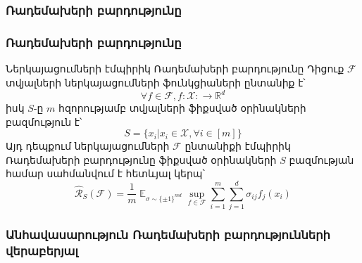 \documentclass[10pt]{beamer}
\DeclareMathOperator*{\E}{\mathbb{E}}
\begin{document}
\section{}


\subsection{}

\begin{frame}
\frametitle{\armfont Ռադեմախերի բարդությունը}
\end{frame}

\begin{frame}
\frametitle{\armfont Ռադեմախերի բարդությունը}

\begin{block}{\armfont Ներկայացումների էմպիրիկ Ռադեմախերի բարդությունը}
 \fontsize{8pt}{8pt}
\armfont Դիցուք $\mathcal{F}$ տվյալների ներկայացումների ֆունկցիաների ընտանիք է՝ $$\forall f \in \mathcal{F}, f:\mathcal{X}: \rightarrow \mathbb{R}^d$$
իսկ $S$-ը $m$ հզորությամբ տվյալների ֆիքսված օրինակների բազմություն է՝
$$S = \{x_i | x_i \in \mathcal{X}, \forall i \in [m]\}$$
Այդ դեպքում ներկայացումների $\mathcal{F}$ ընտանիքի էմպիրիկ Ռադեմախերի բարդությունը ֆիքսված օրինակների $S$ բազմության համար սահմանվում է հետևյալ կերպ՝
$$\hat{\mathcal{R}}_S(\mathcal{F}) = \frac{1}{m} \E_{\sigma \sim \{\pm 1\}^{md}} \sup_{f\in \mathcal{F}} \sum_{i = 1}^m \sum_{j = 1}^d \sigma_{ij} f_j(x_i) $$
\end{block}

\end{frame}


\begin{frame}
\frametitle{\armfont Անհավասարություն Ռադեմախերի բարդությունների վերաբերյալ}
\end{frame}
\end{document}
